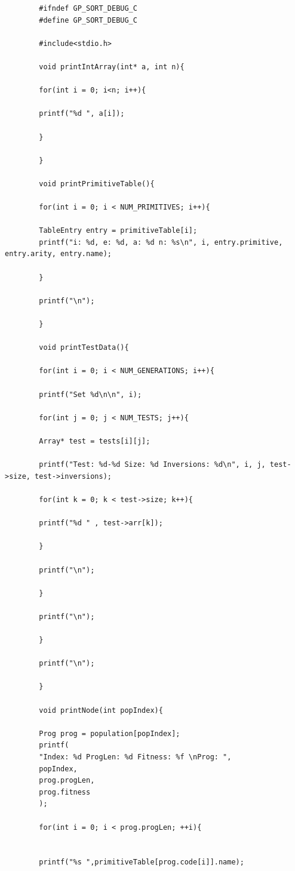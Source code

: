 \documentclass{article}
\begin{document}
	    \begin{lstlisting}
	    #ifndef GP_SORT_DEBUG_C
	    #define GP_SORT_DEBUG_C
	    
	    #include<stdio.h>
	    
	    void printIntArray(int* a, int n){
	    
	    for(int i = 0; i<n; i++){
	    
	    printf("%d ", a[i]);
	    
	    }
	    
	    }
	    
	    void printPrimitiveTable(){
	    
	    for(int i = 0; i < NUM_PRIMITIVES; i++){
	    
	    TableEntry entry = primitiveTable[i];
	    printf("i: %d, e: %d, a: %d n: %s\n", i, entry.primitive, entry.arity, entry.name);
	    
	    }
	    
	    printf("\n");
	    
	    }
	    
	    void printTestData(){
	    
	    for(int i = 0; i < NUM_GENERATIONS; i++){
	    
	    printf("Set %d\n\n", i);
	    
	    for(int j = 0; j < NUM_TESTS; j++){
	    
	    Array* test = tests[i][j];
	    
	    printf("Test: %d-%d Size: %d Inversions: %d\n", i, j, test->size, test->inversions);
	    
	    for(int k = 0; k < test->size; k++){
	    
	    printf("%d " , test->arr[k]);
	    
	    }
	    
	    printf("\n");
	    
	    }
	    
	    printf("\n");
	    
	    }
	    
	    printf("\n");
	    
	    }
	    
	    void printNode(int popIndex){
	    
	    Prog prog = population[popIndex];
	    printf(
	    "Index: %d ProgLen: %d Fitness: %f \nProg: ", 
	    popIndex,
	    prog.progLen,
	    prog.fitness
	    );
	    
	    for(int i = 0; i < prog.progLen; ++i){
	    
	    
	    printf("%s ",primitiveTable[prog.code[i]].name);
	    

\end{lstlisting}
\end{document}
